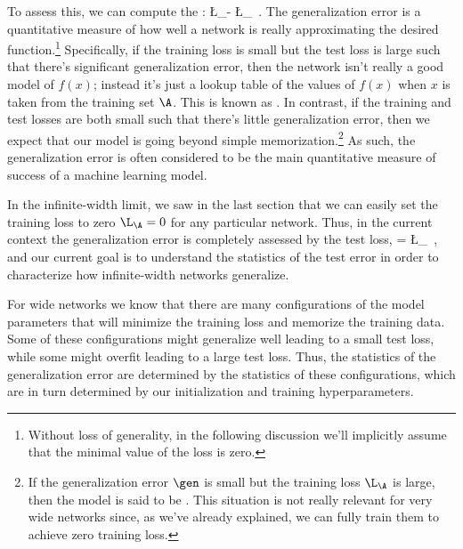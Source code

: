 To assess this, we can compute the : 
\be\label{eq:generalization-error}
\gen \equiv \L_\B - \L_\A\, .
\ee
The generalization error is a quantitative measure of how well a network is really approximating the desired function.\footnote{Without loss of generality, in the following discussion  we'll implicitly assume that the minimal value of the loss is zero.}
Specifically, if the training loss is small but the test loss is large such that there's significant generalization error, then the network isn't really a good model of $f(x)$; instead it's just a lookup table of the values of $f(x)$ when $x$ is taken from the training set $\A$. This is known as . In contrast,
if the training and test losses are both small such that there's  little generalization error, then we expect that our model is going beyond simple memorization.\footnote{
    If the generalization error $\gen$ is small but the training loss $\L_\A$ is large, then the model is said to be .
    This situation is not really relevant for very wide networks since, as we've already explained, we can fully train them to achieve zero training loss.
}
As such, the generalization error is often considered to be the main quantitative measure of success of a machine learning model.


In the infinite-width limit, we saw in the last section that we can easily set the training loss to zero $\L_\A = 0$ for any particular network. Thus, in the current context the generalization error is completely assessed by the test loss, 
\be
\gen = \L_\B \, ,
\ee
and our current goal is to understand the statistics of the test error in order to characterize how infinite-width networks generalize.

For wide networks we know that there are many configurations of the model parameters that will minimize the training loss and memorize the training data. Some of these configurations might generalize well leading to a small test loss, while some might overfit leading to a large test loss. Thus, the statistics of the generalization error are determined by the statistics of these configurations, which are in turn determined by our initialization and training hyperparameters. 

